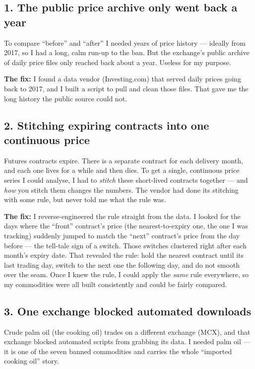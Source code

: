 \documentclass[11pt]{article}
\begin{document}
\subsection*{1. The public price archive only went back a year}

To compare ``before'' and ``after'' I needed years of price history --- ideally from 2017, so I had a long, calm run-up to the ban. But the exchange's public archive of daily price files only reached back about a year. Useless for my purpose.

\textbf{The fix:} I found a data vendor (Investing.com) that served daily prices going back to 2017, and I built a script to pull and clean those files. That gave me the long history the public source could not.

\subsection*{2. Stitching expiring contracts into one continuous price}

Futures contracts expire. There is a separate contract for each delivery month, and each one lives for a while and then dies. To get a single, continuous price series I could analyse, I had to \emph{stitch} these short-lived contracts together --- and \emph{how} you stitch them changes the numbers. The vendor had done its stitching with some rule, but never told me what the rule was.

\textbf{The fix:} I reverse-engineered the rule straight from the data. I looked for the days where the ``front'' contract's price (the nearest-to-expiry one, the one I was tracking) suddenly jumped to match the ``next'' contract's price from the day before --- the tell-tale sign of a switch. Those switches clustered right after each month's expiry date. That revealed the rule: hold the nearest contract until its last trading day, switch to the next one the following day, and do not smooth over the seam. Once I knew the rule, I could apply the \emph{same} rule everywhere, so my commodities were all built consistently and could be fairly compared.

\subsection*{3. One exchange blocked automated downloads}

Crude palm oil (the cooking oil) trades on a different exchange (MCX), and that exchange blocked automated scripts from grabbing its data. I needed palm oil --- it is one of the seven banned commodities and carries the whole ``imported cooking oil'' story.
\end{document}
